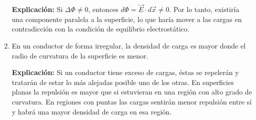 \begin{enumerate}
\textbf{Explicación:} Si $\Delta \Phi \neq 0$, entonces $d\Phi = \vec{E} \cdot d\vec{x} \neq 0$. Por lo tanto, existiría una componente paralela a la superficie, lo que haría mover a las cargas en contradicción con la condición de equilibrio electrostático.

\item En un conductor de forma irregular, la densidad de carga es mayor donde el radio de curvatura de la superficie es menor.

\textbf{Explicación:} Si un conductor tiene exceso de cargas, éstas se repelerán y tratarán de estar lo más alejadas posible uno de los otras. En superficies planas la repulsión es mayor que si estuvieran en una región con alto grado de curvatura. En regiones con puntas las cargas sentirán menor repulsión entre sí y habrá una mayor densidad de carga en esa región.
\end{enumerate}

